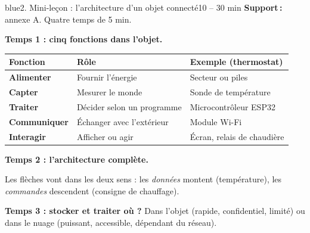 \documentclass[11pt,a4paper]{article}
\begin{document}
\begin{etape}{blue}{2. Mini-leçon : l'architecture d'un objet connecté}{10 -- 30 min}
\textbf{Support\,:} annexe A. Quatre temps de 5 min.

\textbf{Temps 1 : cinq fonctions dans l'objet.}
\begin{center}
\begin{tabularx}{\linewidth}{>{\bfseries}p{3cm}Y Y}
\toprule
Fonction & Rôle & Exemple (thermostat)\\
\midrule
Alimenter & Fournir l'énergie & Secteur ou piles\\
Capter & Mesurer le monde & Sonde de température\\
Traiter & Décider selon un programme & Microcontrôleur ESP32\\
Communiquer & Échanger avec l'extérieur & Module Wi-Fi\\
Interagir & Afficher ou agir & Écran, relais de chaudière\\
\bottomrule
\end{tabularx}
\end{center}

\textbf{Temps 2 : l'architecture complète.}
\begin{center}
\end{center}
Les flèches vont dans les deux sens : les \emph{données} montent (température), les \emph{commandes} descendent (consigne de chauffage).

\textbf{Temps 3 : stocker et traiter où ?} Dans l'objet (rapide, confidentiel, limité) ou dans le nuage (puissant, accessible, dépendant du réseau).


\end{etape}
\end{document}
